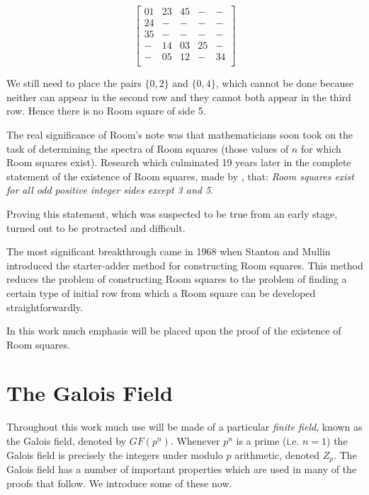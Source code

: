 \documentclass[11pt, a4paper]{book}\usepackage[]{graphicx}\usepackage[]{xcolor}
\begin{document}
\begin{equation}
  \label{eq:fig8}
  \begin{bmatrix}
    01 & 23 & 45 &  - & -  \\
    24 &  - &  - &  - & -  \\
    35 &  - &  - &  - & -  \\
     - & 14 & 03 & 25 & -  \\
     - & 05 & 12 &  - & 34 \\
  \end{bmatrix}
\end{equation}

We still need to place the pairs $\{0, 2\}$ and $\{0, 4\}$, which cannot be done because neither can appear in the second row and they cannot both appear in the third row.
Hence there is no Room square of side 5.

The real significance of Room’s note was that mathematicians soon took on the task of determining the spectra of Room squares (those values of $n$ for which Room squares exist).
Research which culminated 19 years later in the complete statement of the existence of Room squares, made by \cite{wallisSolutionRoomSquare1974},
that: 
\emph{Room squares exist for all odd positive integer sides except 3 and 5}.

Proving this statement, which was suspected to be true from an early stage, turned out to be protracted and difficult.

The most significant breakthrough came in 1968 when Stanton and Mullin introduced the starter-adder method for constructing Room squares.
This method reduces the problem of constructing Room squares to the problem of finding a certain type of initial row from which a Room square can be developed straightforwardly.

In this work much emphasis will be placed upon the proof of the existence of Room squares.

\section{The Galois Field}

Throughout this work much use will be made of a particular
\emph{finite field},
known as the Galois field, denoted by $GF(p^n)$.
Whenever $p^n$ is a prime (i.e. $n = 1$) the Galois field is precisely the integers under modulo $p$ arithmetic, denoted $Z_p$.
The Galois field has a number of important properties which are used in many of the proofs that follow.
We introduce some of these now.
\end{document}
